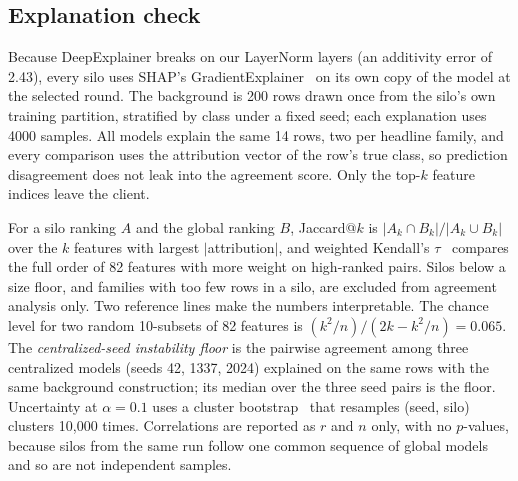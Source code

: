 \documentclass[conference]{IEEEtran}
\begin{document}
\subsection{Explanation check}
\label{sec:m-expl}
Because DeepExplainer breaks on our LayerNorm layers (an additivity error of 2.43), %
every silo uses SHAP's GradientExplainer~\cite{lundberg2017,erion2021} on its own copy of
the model at the selected round. The background is 200 rows drawn once from the silo's %
own training partition, stratified by class under a fixed seed; each explanation uses
4000 samples. %
All models explain the same 14 rows, two per %
headline family, and every comparison uses the attribution vector of the row's true
class, so prediction disagreement does not leak into the agreement score. Only the
top-$k$ feature indices leave the client.

For a silo ranking $A$ and the global ranking $B$, Jaccard@$k$ is
$|A_k\cap B_k|/|A_k\cup B_k|$ over the $k$ features with largest $|$attribution$|$, and
weighted Kendall's $\tau$~\cite{vigna2015} compares the full order of 82 features with %
more weight on high-ranked pairs. Silos below a size floor, and families with too few
rows in a silo, are excluded from agreement analysis only. Two reference lines make the
numbers interpretable. The chance level for two random 10-subsets of 82 features is %
$(k^2/n)/(2k-k^2/n)=0.065$. The \emph{centralized-seed instability floor} is the %
pairwise agreement among three centralized models (seeds 42, 1337, 2024) explained on the %
same rows with the same background construction; its median over the three seed pairs is
the floor. Uncertainty at $\alpha=0.1$ uses a cluster bootstrap~\cite{fieldwelsh2007} %
that resamples (seed, silo) clusters 10,000 times. Correlations are reported as $r$ and %
$n$ only, with no $p$-values, because silos from the same run follow one common sequence
of global models and so are not independent samples.
\end{document}
